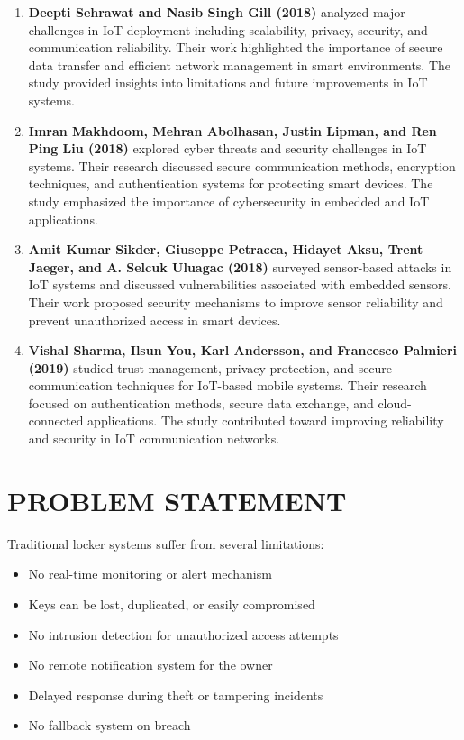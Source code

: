 \documentclass[conference]{IEEEtran}
\begin{document}
\begin{enumerate}
\item \textbf{Deepti Sehrawat and Nasib Singh Gill (2018)} analyzed major challenges in IoT deployment including scalability, privacy, security, and communication reliability. Their work highlighted the importance of secure data transfer and efficient network management in smart environments. The study provided insights into limitations and future improvements in IoT systems.

\item \textbf{Imran Makhdoom, Mehran Abolhasan, Justin Lipman, and Ren Ping Liu (2018)} explored cyber threats and security challenges in IoT systems. Their research discussed secure communication methods, encryption techniques, and authentication systems for protecting smart devices. The study emphasized the importance of cybersecurity in embedded and IoT applications.

\item \textbf{Amit Kumar Sikder, Giuseppe Petracca, Hidayet Aksu, Trent Jaeger, and A. Selcuk Uluagac (2018)} surveyed sensor-based attacks in IoT systems and discussed vulnerabilities associated with embedded sensors. Their work proposed security mechanisms to improve sensor reliability and prevent unauthorized access in smart devices.

\item \textbf{Vishal Sharma, Ilsun You, Karl Andersson, and Francesco Palmieri (2019)} studied trust management, privacy protection, and secure communication techniques for IoT-based mobile systems. Their research focused on authentication methods, secure data exchange, and cloud-connected applications. The study contributed toward improving reliability and security in IoT communication networks.

\end{enumerate}

\section{PROBLEM STATEMENT}

Traditional locker systems suffer from several limitations:

\begin{itemize}
    \item No real-time monitoring or alert mechanism
    \item Keys can be lost, duplicated, or easily compromised
    \item No intrusion detection for unauthorized access attempts
    \item No remote notification system for the owner
    \item Delayed response during theft or tampering incidents
    \item No fallback system on breach
\end{itemize}
\end{document}
